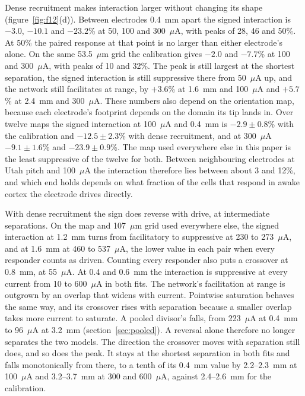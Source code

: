 \documentclass[10pt,twocolumn]{article}
\newcommand{\um}{\ensuremath{\mu\text{m}}}
\newcommand{\uA}{\ensuremath{\mu\text{A}}}
\begin{document}
Dense recruitment makes interaction larger without changing its shape
(figure~\ref{fig:f12}(d)). Between electrodes 0.4~mm apart the signed
interaction is $-3.0$, $-10.1$ and $-23.2$\% at 50, 100 and 300~\uA,
with peaks of 28, 46 and 50\%. At 50\% the paired response at that point
is no larger than either electrode's alone. On the same 53.5~\um{} grid
the calibration gives $-2.0$ and $-7.7$\% at 100 and 300~\uA, with peaks
of 10 and 32\%. The peak is still largest at the shortest separation, the
signed interaction is still suppressive there from 50~\uA{} up, and the
network still facilitates at range, by $+3.6$\% at 1.6~mm and 100~\uA{}
and $+5.7$\% at 2.4~mm and 300~\uA. These numbers also depend on the
orientation map, because each electrode's footprint depends on the domain
its tip lands in. Over twelve maps the signed interaction at 100~\uA{} and
0.4~mm is $-2.9\pm0.8$\% with the calibration and $-12.5\pm2.3$\% with
dense recruitment, and at 300~\uA{} $-9.1\pm1.6$\% and $-23.9\pm0.9$\%.
The map used everywhere else in this paper is the least suppressive of
the twelve for both. Between neighbouring electrodes at Utah pitch and
100~\uA{} the interaction therefore lies between about 3 and 12\%, and
which end holds depends on what fraction of the cells that respond in
awake cortex the electrode drives directly.

With dense recruitment the sign does reverse with drive, at intermediate
separations. On the map and 107~\um{} grid used everywhere else, the signed
interaction at 1.2~mm turns from facilitatory to suppressive at 230 to
273~\uA, and at 1.6~mm at 460 to 537~\uA, the lower value in each pair
when every responder counts as driven. Counting every responder also puts
a crossover at 0.8~mm, at 55~\uA. At 0.4 and 0.6~mm the interaction is
suppressive at every current from 10 to 600~\uA{} in both fits. The
network's facilitation at range is outgrown by an overlap that widens with
current. Pointwise saturation behaves the same way, and its crossover rises
with separation because a smaller overlap takes more current to saturate.
A pooled divisor's falls, from 223~\uA{} at 0.4~mm to 96~\uA{} at 3.2~mm
(section~\ref{sec:pooled}). A reversal alone therefore no longer separates
the two models. The direction the crossover moves with separation still
does, and so does the peak. It stays at the shortest separation in both
fits and falls monotonically from there, to a tenth of its 0.4~mm value by
2.2--2.3~mm at 100~\uA{} and 3.2--3.7~mm at 300 and 600~\uA, against
2.4--2.6~mm for the calibration.
\end{document}
